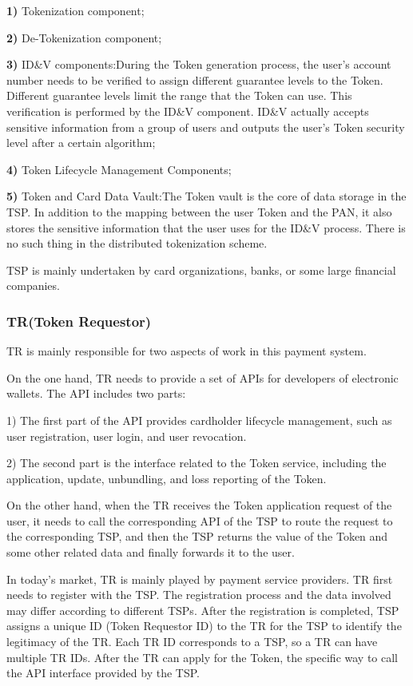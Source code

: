 \documentclass[journal]{IEEEtran}
\begin{document}
\textbf{1)} Tokenization component;
 
\textbf{2)} De-Tokenization component;
 
\textbf{3)} ID\&V components:During the Token generation process, the user's account number needs to be verified to assign different guarantee levels to the Token. Different guarantee levels limit the range that the Token can use. This verification is performed by the ID\&V component. ID\&V actually accepts sensitive information from a group of users and outputs the user's Token security level after a certain algorithm;
 
\textbf{4)} Token Lifecycle Management Components;
 
\textbf{5)} Token and Card Data Vault:The Token vault is the core of data storage in the TSP. In addition to the mapping between the user Token and the PAN, it also stores the sensitive information that the user uses for the ID\&V process. There is no such thing in the distributed tokenization scheme.

TSP is mainly undertaken by card organizations, banks, or some large financial companies.




\subsubsection{TR(Token Requestor)}
TR is mainly responsible for two aspects of work in this payment system.

On the one hand, TR needs to provide a set of APIs for developers of electronic wallets. The API includes two parts:

1) The first part of the API provides cardholder lifecycle management, such as user registration, user login, and user revocation.

2) The second part is the interface related to the Token service, including the application, update, unbundling, and loss reporting of the Token.

On the other hand, when the TR receives the Token application request of the user, it needs to call the corresponding API of the TSP to route the request to the corresponding TSP, and then the TSP returns the value of the Token and some other related data and finally forwards it to the user.

In today's market, TR is mainly played by payment service providers. TR first needs to register with the TSP. The registration process and the data involved may differ according to different TSPs. After the registration is completed, TSP assigns a unique ID (Token Requestor ID) to the TR for the TSP to identify the legitimacy of the TR. Each TR ID corresponds to a TSP, so a TR can have multiple TR IDs. After the TR can apply for the Token, the specific way to call the API interface provided by the TSP.
\end{document}
